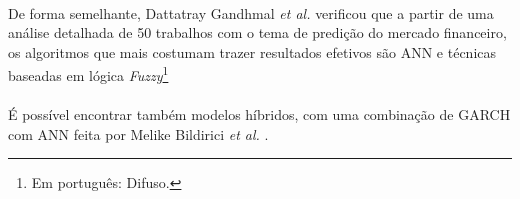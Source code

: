\paragraph{} De forma semelhante, Dattatray Gandhmal \textit{et al.} \cite{gandhmal2019systematic} verificou que a partir de uma análise detalhada de 50 trabalhos com o tema de predição do mercado financeiro, os algoritmos que mais costumam trazer resultados efetivos são ANN e técnicas baseadas em lógica \textit{Fuzzy}\footnote{Em português: Difuso.}

\paragraph{} É possível encontrar também modelos híbridos, com uma combinação de GARCH com ANN feita por Melike Bildirici \textit{et al.} \cite{bildirici2009improving}.